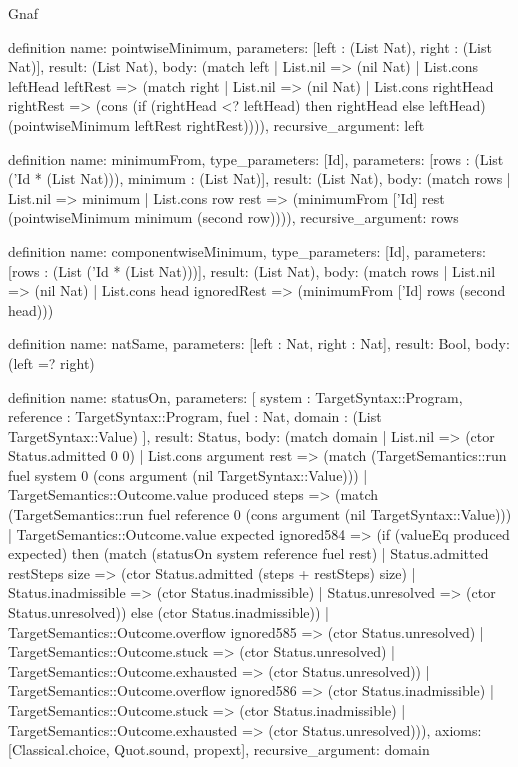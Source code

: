 \begin{lexlean}{Gnaf}
\begin{semanticmodule}
definition{
  name: pointwiseMinimum,
  parameters: [left : (List Nat), right : (List Nat)],
  result: (List Nat),
  body: (match left
    | List.nil => (nil Nat)
    | List.cons leftHead leftRest => (match right
      | List.nil => (nil Nat)
      | List.cons rightHead rightRest => (cons (if (rightHead <? leftHead) then rightHead else leftHead) (pointwiseMinimum leftRest rightRest)))),
  recursive_argument: left
}

definition{
  name: minimumFrom,
  type_parameters: [Id],
  parameters: [rows : (List ('Id * (List Nat))), minimum : (List Nat)],
  result: (List Nat),
  body: (match rows
    | List.nil => minimum
    | List.cons row rest => (minimumFrom ['Id] rest (pointwiseMinimum minimum (second row)))),
  recursive_argument: rows
}

definition{
  name: componentwiseMinimum,
  type_parameters: [Id],
  parameters: [rows : (List ('Id * (List Nat)))],
  result: (List Nat),
  body: (match rows
    | List.nil => (nil Nat)
    | List.cons head ignoredRest => (minimumFrom ['Id] rows (second head)))
}

definition{
  name: natSame,
  parameters: [left : Nat, right : Nat],
  result: Bool,
  body: (left =? right)
}

definition{
  name: statusOn,
  parameters: [
    system : TargetSyntax::Program,
    reference : TargetSyntax::Program,
    fuel : Nat,
    domain : (List TargetSyntax::Value)
  ],
  result: Status,
  body: (match domain
    | List.nil => (ctor Status.admitted 0 0)
    | List.cons argument rest => (match (TargetSemantics::run fuel system 0 (cons argument (nil TargetSyntax::Value)))
      | TargetSemantics::Outcome.value produced steps => (match (TargetSemantics::run fuel reference 0 (cons argument (nil TargetSyntax::Value)))
        | TargetSemantics::Outcome.value expected ignored584 => (if (valueEq produced expected) then (match (statusOn system reference fuel rest)
          | Status.admitted restSteps size => (ctor Status.admitted (steps + restSteps) size)
          | Status.inadmissible => (ctor Status.inadmissible)
          | Status.unresolved => (ctor Status.unresolved)) else (ctor Status.inadmissible))
        | TargetSemantics::Outcome.overflow ignored585 => (ctor Status.unresolved)
        | TargetSemantics::Outcome.stuck => (ctor Status.unresolved)
        | TargetSemantics::Outcome.exhausted => (ctor Status.unresolved))
      | TargetSemantics::Outcome.overflow ignored586 => (ctor Status.inadmissible)
      | TargetSemantics::Outcome.stuck => (ctor Status.inadmissible)
      | TargetSemantics::Outcome.exhausted => (ctor Status.unresolved))),
  axioms: [Classical.choice, Quot.sound, propext],
  recursive_argument: domain
}


\end{semanticmodule}
\end{lexlean}
